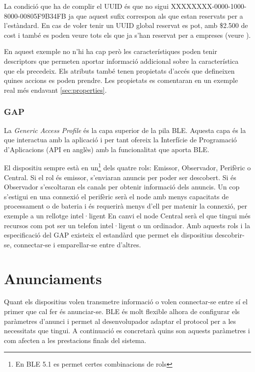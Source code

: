 La condició que ha de complir el UUID és que no sigui XXXXXXXX-0000-1000-8000-00805F9B34FB ja que aquest sufix correspon als que estan reservats per a l'estàndard.
En cas de voler tenir un UUID global reservat es pot, amb \$2.500 de cost i també es poden veure tots els que ja s'han reservat per a empreses (veure \cite{reservedUUIDs}).

En aquest exemple no n'hi ha cap però les característiques poden tenir descriptors \cite{descriptors} que permeten aportar informació addicional sobre la característica que els precedeix.
Els atributs també tenen propietats d'accés que defineixen quines accions es poden prendre.
Les propietats es comentaran en un exemple real més endavant \ref{sec:properties}.

\subsubsection{GAP}
La \textit{Generic Access Profile} és la capa superior de la pila BLE.
Aquesta capa és la que interactua amb la aplicació i per tant ofereix la Interfície de Programació d'Aplicacions (API en anglès) amb la funcionalitat que aporta BLE.

El dispositiu sempre està en un\footnote{En BLE 5.1 es permet certes combinacions de rols} dels quatre rols: Emissor, Observador, Perifèric o Central.
Si el rol és emissor, s'enviaran anuncis per poder ser descobert.
Si és Observador s'escoltaran els canals per obtenir informació dels anuncis.
Un cop s'estigui en una connexió el perifèric serà el node amb menys capacitats de processament o de bateria i és requerirà menys d'ell per matenir la connexió, per exemple a un rellotge intel·ligent
En canvi el node Central serà el que tingui més recursos com pot ser un telefon intel·ligent o un ordinador.
Amb aquests rols i la especificació del GAP existeix el estandàrd que permet els dispositius descobrir-se, connectar-se  i emparellar-se entre d'altres.


\section{Anunciaments}
Quant els dispositius volen transmetre informació o volen connectar-se entre sí el primer que cal fer és anunciar-se.
BLE és molt flexible alhora de configurar els paràmetres d'anunci i permet al desenvolupador adaptar el protocol per a les necessitats que tingui.
A continuació es concretarà quins son aquests paràmetres i com afecten a les prestacions finals del sistema.

